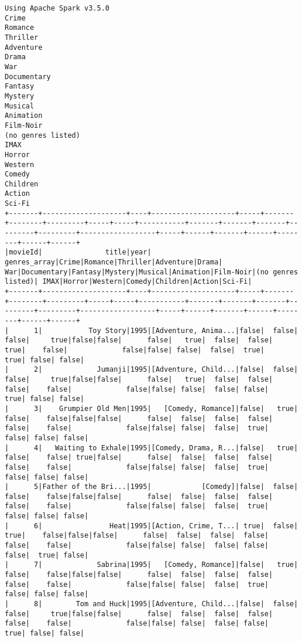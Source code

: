 \documentclass{article}
\begin{document}
\begin{verbatim}
Using Apache Spark v3.5.0
Crime
Romance
Thriller
Adventure
Drama
War
Documentary
Fantasy
Mystery
Musical
Animation
Film-Noir
(no genres listed)
IMAX
Horror
Western
Comedy
Children
Action
Sci-Fi
+-------+--------------------+----+--------------------+-----+-------+--------+---------+-----+-----+-----------+-------+-------+-------+---------+---------+------------------+-----+------+-------+------+--------+------+------+
|movieId|               title|year|        genres_array|Crime|Romance|Thriller|Adventure|Drama|  War|Documentary|Fantasy|Mystery|Musical|Animation|Film-Noir|(no genres listed)| IMAX|Horror|Western|Comedy|Children|Action|Sci-Fi|
+-------+--------------------+----+--------------------+-----+-------+--------+---------+-----+-----+-----------+-------+-------+-------+---------+---------+------------------+-----+------+-------+------+--------+------+------+
|      1|           Toy Story|1995|[Adventure, Anima...|false|  false|   false|     true|false|false|      false|   true|  false|  false|     true|    false|             false|false| false|  false|  true|    true| false| false|
|      2|             Jumanji|1995|[Adventure, Child...|false|  false|   false|     true|false|false|      false|   true|  false|  false|    false|    false|             false|false| false|  false| false|    true| false| false|
|      3|    Grumpier Old Men|1995|   [Comedy, Romance]|false|   true|   false|    false|false|false|      false|  false|  false|  false|    false|    false|             false|false| false|  false|  true|   false| false| false|
|      4|   Waiting to Exhale|1995|[Comedy, Drama, R...|false|   true|   false|    false| true|false|      false|  false|  false|  false|    false|    false|             false|false| false|  false|  true|   false| false| false|
|      5|Father of the Bri...|1995|            [Comedy]|false|  false|   false|    false|false|false|      false|  false|  false|  false|    false|    false|             false|false| false|  false|  true|   false| false| false|
|      6|                Heat|1995|[Action, Crime, T...| true|  false|    true|    false|false|false|      false|  false|  false|  false|    false|    false|             false|false| false|  false| false|   false|  true| false|
|      7|             Sabrina|1995|   [Comedy, Romance]|false|   true|   false|    false|false|false|      false|  false|  false|  false|    false|    false|             false|false| false|  false|  true|   false| false| false|
|      8|        Tom and Huck|1995|[Adventure, Child...|false|  false|   false|     true|false|false|      false|  false|  false|  false|    false|    false|             false|false| false|  false| false|    true| false| false|

\end{verbatim}
\end{document}

